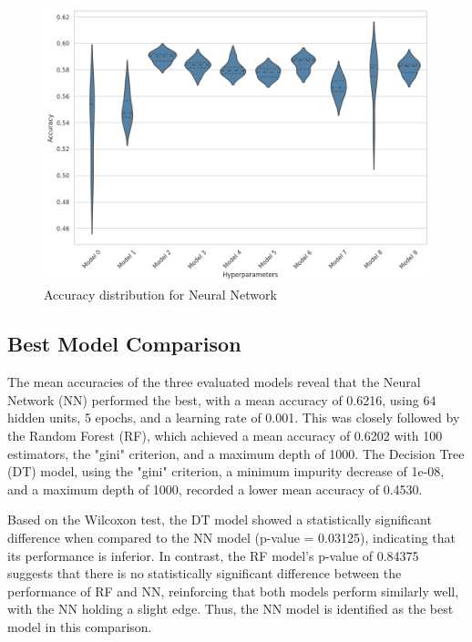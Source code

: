 \begin{figure}[H]
    \centering
    \includegraphics[width=0.99\columnwidth]{images/violin_plot_neural_network.png}
    \caption{Accuracy distribution for Neural Network}
    \label{fig:nn_violin_plot}
\end{figure}



\subsection{Best Model Comparison}
The mean accuracies of the three evaluated models 
reveal that the Neural Network (NN) performed the best, 
with a mean accuracy of 0.6216, using 64 hidden units, 
5 epochs, and a learning rate of 0.001. 
This was closely followed by the Random Forest (RF), 
which achieved a mean accuracy of 0.6202 with 
100 estimators, the "gini" criterion, and a maximum depth 
of 1000. The Decision Tree (DT) model, using the 
"gini" criterion, a minimum impurity decrease of 1e-08, 
and a maximum depth of 1000, recorded a lower 
mean accuracy of 0.4530. 

Based on the Wilcoxon test, the DT model showed 
a statistically significant difference when compared 
to the NN model (p-value = 0.03125), indicating that 
its performance is inferior. In contrast, the RF model's 
p-value of 0.84375 suggests that there is no statistically 
significant difference between the performance of 
RF and NN, reinforcing that both models perform similarly well, 
with the NN holding a slight edge. 
Thus, the NN model is identified as the best model 
in this comparison.


